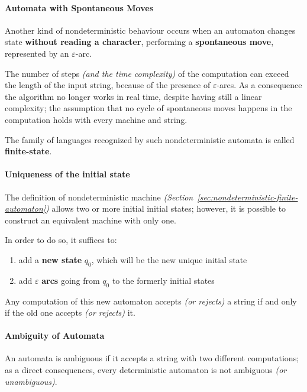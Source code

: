 \documentclass[english]{article}
\begin{document}
\paragraph{Automata with Spontaneous Moves}

Another kind of nondeterministic behaviour occurs when an automaton changes state \textbf{without reading a character}, performing a \textbf{spontaneous move}, represented by an \(\varepsilon\)-arc.

The number of steps \textit{(and the time complexity)} of the computation can exceed the length of the input string, because of the presence of \(\varepsilon\)-arcs.
As a consequence the algorithm no longer works in real time, despite having still a linear complexity;
the assumption that no cycle of spontaneous moves happens in the computation holds with every machine and string.

The family of languages recognized by such nondeterministic automata is called \textbf{finite-state}.

\paragraph{Uniqueness of the initial state}

The definition of nondeterministic machine \textit{(Section~\ref{sec:nondeterministic-finite-automaton})} allows two or more initial initial states;
however, it is possible to construct an equivalent machine with only one.

In order to do so, it suffices to:

\begin{enumerate}
  \item add a \textbf{new state} \(q_0\), which will be the new unique initial state
  \item add \(\varepsilon\) \textbf{arcs} going from \(q_0\) to the formerly initial states
\end{enumerate}

Any computation of this new automaton accepts \textit{(or rejects)} a string if and only if the old one accepts \textit{(or rejects)} it.

\paragraph{Ambiguity of Automata}

An automata is ambiguous if it accepts a string with two different computations;
as a direct consequences, every deterministic automaton is not ambiguous \textit{(or unambiguous)}.
\end{document}
